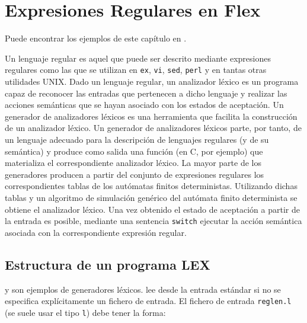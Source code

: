 \section{Expresiones Regulares en Flex} 
Puede encontrar los ejemplos de este capítulo en
.


Un lenguaje regular es aquel que puede ser descrito mediante expresiones
regulares como las que se utilizan en \verb|ex|, \verb|vi|, \verb|sed|,
\verb|perl| y en tantas otras utilidades UNIX. Dado un lenguaje regular,
un analizador l\'exico es un programa capaz de reconocer las entradas
que pertenecen a dicho lenguaje y realizar las acciones sem\'anticas
que se hayan asociado con los estados de aceptaci\'on.
Un generador de analizadores l\'exicos es una herramienta que facilita
la construcci\'on de un analizador l\'exico. Un generador de analizadores
l\'exicos parte, por tanto, de un lenguaje adecuado para la descripci\'on
de lenguajes regulares (y de su sem\'antica) y produce como salida
una funci\'on (en C, por ejemplo) que materializa el correspondiente
analizador l\'exico.
La mayor parte de los generadores producen a partir del conjunto de
expresiones regulares los correspondientes tablas de los autómatas
finitos deterministas. Utilizando dichas tablas y un algoritmo de
simulación genérico del autómata finito determinista se obtiene el
analizador léxico. Una vez obtenido el estado de aceptación a partir de
la entrada es posible, mediante una sentencia \verb|switch| ejecutar la
acción semántica asociada con la correspondiente expresión regular.

\subsection{Estructura de un programa LEX}
\label{section:estructuraflex}


 y  son ejemplos de generadores léxicos. 
lee desde la entrada est\'andar si no se especifica explícitamente
un fichero de entrada. El fichero de entrada \verb|reglen.l| (se suele usar el tipo \verb|l|)
debe tener la forma:\\

